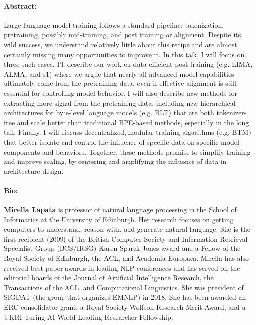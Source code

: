 \paragraph{Abstract:}
Large language model training follows a standard pipeline: tokenization, pretraining, possibly mid-training, and post training or alignment. Despite its wild success, we understand relatively little about this recipe and are almost certainly missing many opportunities to improve it. In this talk, I will focus on three such cases. I’ll describe our work on data efficient post training (e.g. LIMA, ALMA, and s1) where we argue that nearly all advanced model capabilities ultimately come from the pretraining data, even if effective alignment is still essential for controlling model behavior. I will also describe new methods for extracting more signal from the pretraining data, including new hierarchical architectures for byte-level language models (e.g. BLT) that are both tokenizer-free and scale better than traditional BPE-based methods, especially in the long tail. Finally, I will discuss decentralized, modular training algorithms (e.g. BTM) that better isolate and control the influence of specific data on specific model components and behaviors. Together, these methods promise to simplify training and improve scaling, by centering and amplifying the influence of data in architecture design. 

\paragraph{Bio:}
\textbf{Mirella Lapata} is professor of natural language processing in the School of Informatics at the University of Edinburgh. Her research focuses on getting computers to understand, reason with, and generate natural language. She is the first recipient (2009) of the British Computer Society and Information Retrieval Specialist Group (BCS/IRSG) Karen Sparck Jones award and a Fellow of the Royal Society of Edinburgh, the ACL, and Academia Europaea. Mirella has also received best paper awards in leading NLP conferences and has served on the editorial boards of the Journal of Artificial Intelligence Research, the Transactions of the ACL, and Computational Linguistics. She was president of SIGDAT (the group that organizes EMNLP) in 2018. She has been awarded an ERC consolidator grant, a Royal Society Wolfson Research Merit Award, and a UKRI Turing AI World-Leading Researcher Fellowship.\\

